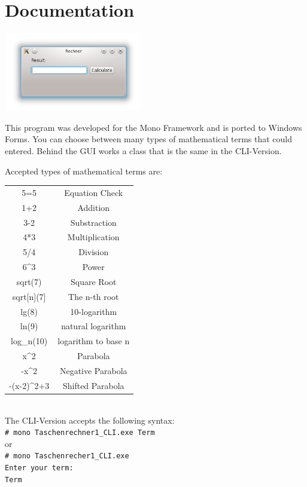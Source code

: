 \documentclass[12pt,a4paper]{scrartcl}
\begin{document}
\section*{Documentation}

\begin{center}
\includegraphics[width=230px,height=130px]{screenshot.png}
\end{center}
This program was developed for the Mono Framework and is ported to Windows Forms. You can choose between many types of mathematical terms that could entered. Behind the GUI works a class that is the same in the CLI-Version. 

Accepted types of mathematical terms are:


\begin{tabular}{|cc|}
\hline
5=5 & Equation Check\\
1+2 & Addition \\
3-2 & Substraction\\
4*3 & Multiplication\\
5/4 & Division\\
6\textasciicircum{}3 & Power\\
sqrt(7) & Square Root\\
sqrt[n](7] & The n-th root\\
lg(8) & 10-logarithm\\
ln(9) & natural logarithm\\
log\_n(10) & logarithm to base n\\
x\textasciicircum{}2 & Parabola\\
-x\textasciicircum{}2 & Negative Parabola\\
-(x-2)\textasciicircum{}2+3 & Shifted Parabola\\
\hline
\end{tabular}
\\
The CLI-Version accepts the following syntax:\\
\texttt{\# mono Taschenrechner1\_CLI.exe Term}\\
or\\
\texttt{\# mono Taschenrecher1\_CLI.exe\\
Enter your term:\\
Term
}
\end{document}

